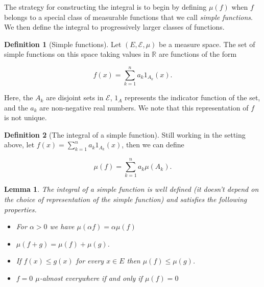 \documentclass[
]{book}
\providecommand{\tightlist}{%
  \setlength{\itemsep}{0pt}\setlength{\parskip}{0pt}}
\newtheorem{lemma}{Lemma}[chapter]
\theoremstyle{definition}
\newtheorem{definition}{Definition}[chapter]
\theoremstyle{definition}
\theoremstyle{definition}
\theoremstyle{definition}
\theoremstyle{remark}
\begin{document}
The strategy for constructing the integral is to begin by defining \(\mu(f)\) when \(f\) belongs to a special class of measurable functions that we call \emph{simple functions}. We then define the integral to progressively larger classes of functions.

\begin{definition}[Simple functions]
Let \((E, \mathcal{E}, \mu)\) be a measure space. The set of simple functions on this space taking values in \(\mathbb{R}\) are functions of the form

\[ f(x) = \sum_{k=1}^n a_k 1_{A_k}(x). \]

Here, the \(A_k\) are disjoint sets in \(\mathcal{E}\), \(1_{A}\) represents the indicator function of the set, and the \(a_k\) are non-negative real numbers. We note that this representation of \(f\) is not unique.
\end{definition}

\begin{definition}[The integral of a simple function]
Still working in the setting above, let \(f(x) = \sum_{k=1}^n a_k 1_{A_k}(x)\), then we can define

\[ \mu(f) = \sum_{k=1}^n a_k \mu(A_k). \]
\end{definition}

\begin{lemma}

The integral of a simple function is well defined (it doesn't depend on the choice of representation of the simple function) and satisfies the following properties.

\begin{itemize}
\tightlist
\item
  For \(\alpha >0\) we have \(\mu(\alpha f) = \alpha \mu(f)\)
\item
  \(\mu(f+g) = \mu(f) + \mu(g)\).
\item
  If \(f(x) \leq g(x)\) for every \(x \in E\) then \(\mu(f) \leq \mu(g)\).
\item
  \(f=0\) \(\mu\)-almost everywhere if and only if \(\mu(f)=0\)
\end{itemize}

\end{lemma}
\end{document}
